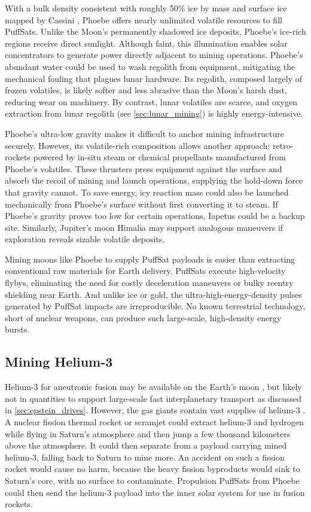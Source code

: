 \documentclass{article}
\begin{document}
With a bulk density consistent with roughly 50\% ice by mass \cite{castillo_rogez2012_phoebe} and surface ice mapped by Cassini \cite{phoebe}, Phoebe offers nearly unlimited volatile resources to fill PuffSats. Unlike the Moon's permanently shadowed ice deposits, Phoebe's ice-rich regions receive direct sunlight. Although faint, this illumination enables solar concentrators to generate power directly adjacent to mining operations. Phoebe's abundant water could be used to wash regolith from equipment, mitigating the mechanical fouling that plagues lunar hardware. Its regolith, composed largely of frozen volatiles, is likely softer and less abrasive than the Moon's harsh dust, reducing wear on machinery. By contrast, lunar volatiles are scarce, and oxygen extraction from lunar regolith (see \autoref{sec:lunar_mining}) is highly energy-intensive.

Phoebe's ultra-low gravity makes it difficult to anchor mining infrastructure securely. However, its volatile-rich composition allows another approach: retro-rockets powered by in-situ steam or chemical propellants manufactured from Phoebe's volatiles. These thrusters press equipment against the surface and absorb the recoil of mining and launch operations, supplying the hold-down force that gravity cannot. To save energy, icy reaction mass could also be launched mechanically from Phoebe's surface without first converting it to steam. If Phoebe's gravity proves too low for certain operations, Iapetus could be a backup site. Similarly, Jupiter's moon Himalia may support analogous maneuvers if exploration reveals sizable volatile deposits.

Mining moons like Phoebe to supply PuffSat payloads is easier than extracting conventional raw materials for Earth delivery. PuffSats execute high-velocity flybys, eliminating the need for costly deceleration maneuvers or bulky reentry shielding near Earth. And unlike ice or gold, the ultra-high-energy-density pulses generated by PuffSat impacts are irreproducible. No known terrestrial technology, short of nuclear weapons, can produce such large-scale, high-density energy bursts.

\subsection{Mining Helium-3} \label{sec:mining_helium_3}
Helium-3 for aneutronic fusion may be available on the Earth's moon \cite{wittenberg1986lunar_he3}, but likely not in quantities to support large-scale fast interplanetary transport as discussed in \autoref{sec:epstein_drives}.   However, the gas giants contain vast supplies of helium-3 \cite{palaszewski2005atmospheric}.   A nuclear fission thermal rocket or scramjet could extract helium-3 and hydrogen while flying in Saturn's atmosphere and then jump a few thousand kilometers above the atmosphere.  It could then separate from a payload carrying mined helium-3, falling back to Saturn to mine more.  An accident on such a fission rocket would cause no harm, because the heavy fission byproducts would sink to Saturn's core, with no surface to contaminate. Propulsion PuffSats from Phoebe could then send the helium-3 payload into the inner solar system for use in fusion rockets.  
\end{document}
